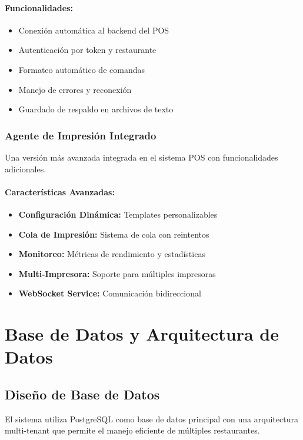 \documentclass[12pt,a4paper]{article}
\begin{document}
\paragraph{Funcionalidades:}
\begin{itemize}
    \item Conexión automática al backend del POS
    \item Autenticación por token y restaurante
    \item Formateo automático de comandas
    \item Manejo de errores y reconexión
    \item Guardado de respaldo en archivos de texto
\end{itemize}

\subsubsection{Agente de Impresión Integrado}

Una versión más avanzada integrada en el sistema POS con funcionalidades adicionales.

\paragraph{Características Avanzadas:}
\begin{itemize}
    \item \textbf{Configuración Dinámica:} Templates personalizables
    \item \textbf{Cola de Impresión:} Sistema de cola con reintentos
    \item \textbf{Monitoreo:} Métricas de rendimiento y estadísticas
    \item \textbf{Multi-Impresora:} Soporte para múltiples impresoras
    \item \textbf{WebSocket Service:} Comunicación bidireccional
\end{itemize}

\section{Base de Datos y Arquitectura de Datos}

\subsection{Diseño de Base de Datos}

El sistema utiliza PostgreSQL como base de datos principal con una arquitectura multi-tenant que permite el manejo eficiente de múltiples restaurantes.
\end{document}
